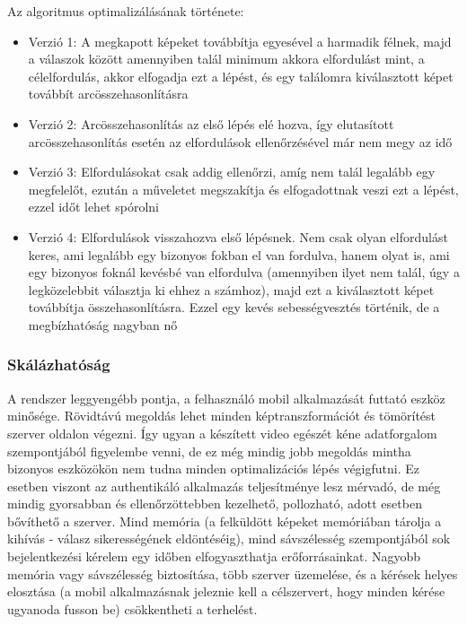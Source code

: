 Az algoritmus optimalizálásának története:
\begin{itemize}
\item Verzió 1: A megkapott képeket továbbítja egyesével a harmadik félnek, majd a válaszok között amennyiben talál minimum akkora elfordulást mint, a célelfordulás, akkor elfogadja ezt a lépést, és egy találomra kiválasztott képet továbbít arcösszehasonlításra
\item Verzió 2: Arcösszehasonlítás az első lépés elé hozva, így elutasított arcösszehasonlítás esetén az elfordulások ellenőrzésével már nem megy az idő
\item Verzió 3: Elfordulásokat csak addig ellenőrzi, amíg nem talál legalább egy megfelelőt, ezután a műveletet megszakítja és elfogadottnak veszi ezt a lépést, ezzel időt lehet spórolni
\item Verzió 4: Elfordulások visszahozva első lépésnek. Nem csak olyan elfordulást keres, ami legalább egy bizonyos fokban el van fordulva, hanem olyat is, ami egy bizonyos foknál kevésbé van elfordulva (amennyiben ilyet nem talál, úgy a legközelebbit választja ki ehhez a számhoz), majd ezt a kiválasztott képet továbbítja összehasonlításra. Ezzel egy kevés sebességvesztés történik, de a megbízhatóság nagyban nő
\end{itemize}

\subsubsection{Skálázhatóság}
A rendszer leggyengébb pontja, a felhasználó mobil alkalmazását futtató eszköz minősége. Rövidtávú megoldás lehet minden képtranszformációt és tömörítést szerver oldalon végezni. Így ugyan a készített video egészét kéne adatforgalom szempontjából figyelembe venni, de ez még mindig jobb megoldás mintha bizonyos eszközökön nem tudna minden optimalizációs lépés végigfutni.
Ez esetben viszont az authentikáló alkalmazás teljesítménye lesz mérvadó, de még mindig gyorsabban és ellenőrzöttebben kezelhető, pollozható, adott esetben bővíthető a szerver. Mind memória (a felküldött képeket memóriában tárolja a kihívás - válasz sikerességének eldöntéséig), mind sávszélesség szempontjából sok bejelentkezési kérelem egy időben elfogyaszthatja erőforrásainkat. Nagyobb memória vagy sávszélesség biztosítása, több szerver üzemelése, és a kérések helyes elosztása (a mobil alkalmazásnak jeleznie kell a célszervert, hogy minden kérése ugyanoda fusson be) csökkentheti a terhelést.


